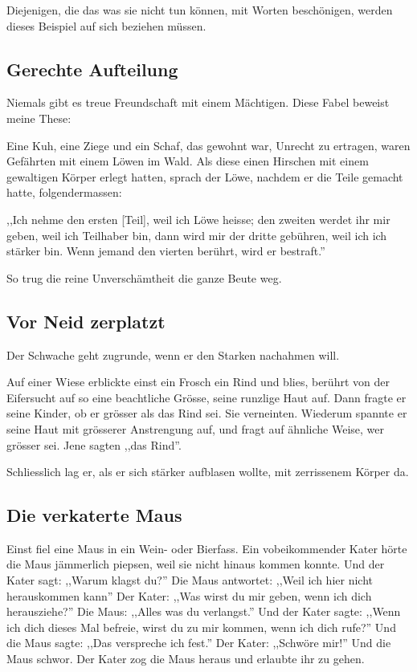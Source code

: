 \documentclass[a4paper]{article}
\begin{document}
Diejenigen, die das was sie nicht tun können, mit Worten beschönigen, werden dieses Beispiel auf sich beziehen müssen.

\subsection{Gerechte Aufteilung}
Niemals gibt es treue Freundschaft mit einem Mächtigen. Diese Fabel beweist meine These:

Eine Kuh, eine Ziege und ein Schaf, das gewohnt war, Unrecht zu ertragen, waren Gefährten mit einem Löwen im Wald. Als diese einen Hirschen mit einem gewaltigen Körper erlegt hatten, sprach der Löwe, nachdem er die Teile gemacht hatte, folgendermassen:

,,Ich nehme den ersten [Teil], weil ich Löwe heisse; den zweiten werdet ihr mir geben, weil ich Teilhaber bin, dann wird mir der dritte gebühren, weil ich ich stärker bin. Wenn jemand den vierten berührt, wird er bestraft.''

So trug die reine Unverschämtheit die ganze Beute weg.

\subsection{Vor Neid zerplatzt}
Der Schwache geht zugrunde, wenn er den Starken nachahmen will.

Auf einer Wiese erblickte einst ein Frosch ein Rind und blies, berührt von der Eifersucht auf so eine beachtliche Grösse, seine runzlige Haut auf. Dann fragte er seine Kinder, ob er grösser als das Rind sei. Sie verneinten. Wiederum spannte er seine Haut mit grösserer Anstrengung auf, und fragt auf ähnliche Weise, wer grösser sei. Jene sagten ,,das Rind''.

Schliesslich lag er, als er sich stärker aufblasen wollte, mit zerrissenem Körper da.

\subsection{Die verkaterte Maus}
Einst fiel eine Maus in ein Wein- oder Bierfass. Ein vobeikommender Kater hörte die Maus jämmerlich piepsen, weil sie nicht hinaus kommen konnte. Und der Kater sagt: ,,Warum klagst du?'' Die Maus antwortet: ,,Weil ich hier nicht herauskommen kann'' Der Kater: ,,Was wirst du mir geben, wenn ich dich herausziehe?'' Die Maus: ,,Alles was du verlangst.'' Und der Kater sagte: ,,Wenn ich dich dieses Mal befreie, wirst du zu mir kommen, wenn ich dich rufe?'' Und die Maus sagte: ,,Das verspreche ich fest.'' Der Kater: ,,Schwöre mir!'' Und die Maus schwor. Der Kater zog die Maus heraus und erlaubte ihr zu gehen.
\end{document}
